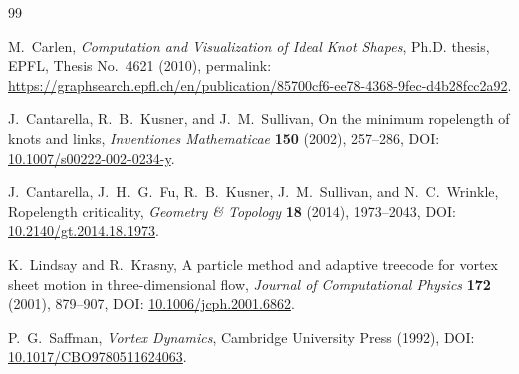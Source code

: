 \begin{thebibliography}{99}

M.~Carlen,
\newblock \emph{Computation and Visualization of Ideal Knot Shapes},
\newblock Ph.D. thesis, EPFL, Thesis No.~4621 (2010),
\newblock permalink: \url{https://graphsearch.epfl.ch/en/publication/85700cf6-ee78-4368-9fec-d4b28fcc2a92}.

J.~Cantarella, R.~B.~Kusner, and J.~M.~Sullivan,
\newblock On the minimum ropelength of knots and links,
\newblock \emph{Inventiones Mathematicae} \textbf{150} (2002), 257--286,
\newblock DOI: \href{https://doi.org/10.1007/s00222-002-0234-y}{10.1007/s00222-002-0234-y}.

J.~Cantarella, J.~H.~G.~Fu, R.~B.~Kusner, J.~M.~Sullivan, and N.~C.~Wrinkle,
\newblock Ropelength criticality,
\newblock \emph{Geometry \& Topology} \textbf{18} (2014), 1973--2043,
\newblock DOI: \href{https://doi.org/10.2140/gt.2014.18.1973}{10.2140/gt.2014.18.1973}.

K.~Lindsay and R.~Krasny,
\newblock A particle method and adaptive treecode for vortex sheet motion in three-dimensional flow,
\newblock \emph{Journal of Computational Physics} \textbf{172} (2001), 879--907,
\newblock DOI: \href{https://doi.org/10.1006/jcph.2001.6862}{10.1006/jcph.2001.6862}.

P.~G.~Saffman,
\newblock \emph{Vortex Dynamics},
\newblock Cambridge University Press (1992),
\newblock DOI: \href{https://doi.org/10.1017/CBO9780511624063}{10.1017/CBO9780511624063}.

\end{thebibliography}
